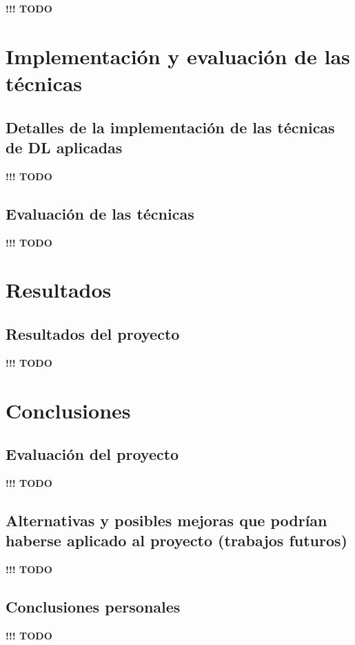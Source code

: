 \documentclass[]{article}
\begin{document}

\textbf{!!! TODO}


\newpage
\section{Implementación y evaluación de las técnicas}


\subsection{Detalles de la implementación de las técnicas de DL aplicadas}


\textbf{!!! TODO}

\subsection{Evaluación de las técnicas}


\textbf{!!! TODO}


\newpage
\section{Resultados}


\subsection{Resultados del proyecto}

\textbf{!!! TODO}


\newpage
\section{Conclusiones}


\subsection{Evaluación del proyecto}

\textbf{!!! TODO}

\subsection{Alternativas y posibles mejoras que podrían haberse aplicado al proyecto (trabajos futuros)}

\textbf{!!! TODO}

\subsection{Conclusiones personales}

\textbf{!!! TODO}

\newpage
\printbibliography[title={Referencias}]
\end{document}
